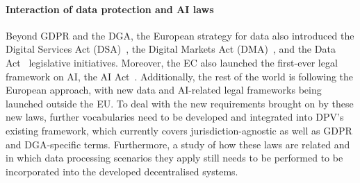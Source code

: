\paragraph{Interaction of data protection and AI laws} Beyond GDPR and the DGA, the European strategy for data also introduced the Digital Services Act (DSA)~\citeyearpar{noauthor_dsa_2022}, the Digital Markets Act (DMA)~\citeyearpar{noauthor_dma_2022}, and the Data Act~\citeyearpar{noauthor_dataact_2022} legislative initiatives. Moreover, the EC also launched the first-ever legal framework on AI, the AI Act~\citeyearpar{noauthor_proposal_2021}.
Additionally, the rest of the world is following the European approach, with new data and AI-related legal frameworks being launched outside the EU. To deal with the new requirements brought on by these new laws, further vocabularies need to be developed and integrated into DPV's existing framework, which currently covers jurisdiction-agnostic as well as GDPR and DGA-specific terms. Furthermore, a study of how these laws are related and in which data processing scenarios they apply still needs to be performed to be incorporated into the developed decentralised systems.